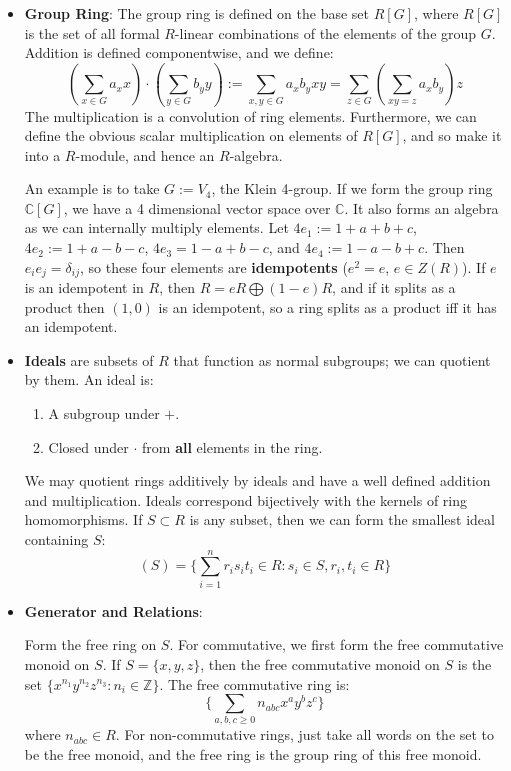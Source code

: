 \documentclass[11pt, oneside]{amsart}   	%
\theoremstyle{definition}
\begin{document}
\begin{itemize}
	\item \textbf{Group Ring}: The group ring is defined on the base set $R[G]$, where $R[G]$ is the set of all formal $R$-linear combinations of the 
	elements of the group $G$. Addition is defined componentwise, and we define:
	$$
		(\sum_{x\in G}a_xx)\cdot(\sum_{y\in G}b_yy) := \sum_{x, y\in G}a_xb_yxy = \sum_{z\in G}(\sum_{xy = z}a_xb_y)z
	$$
	The multiplication is a convolution of ring elements. Furthermore, we can define the obvious scalar multiplication on elements of $R[G]$, and so 
	make it into a $R$-module, and hence an $R$-algebra.
	
	An example is to take $G := V_4$, the Klein 4-group. If we form the group ring $\mathbb C[G]$, we have a 4 dimensional vector space over 
	$\mathbb C$. It also forms an algebra as we can internally multiply elements. Let $4e_1 := 1 + a + b + c$, $4e_2 := 1 + a - b - c$, $4e_3 = 1 - a 
	+ b - c$, and $4e_4 := 1 - a - b + c$. Then $e_ie_j = \delta_{ij}$, so these four elements are \textbf{idempotents} ($e^2 = e$, $e\in Z(R)$). If 
	$e$ is an idempotent in $R$, then $R = eR \bigoplus (1 - e) R$, and if it splits as a product then $(1, 0)$ is an idempotent, so a ring splits as a 
	product iff it has an idempotent.
	
	\item \textbf{Ideals} are subsets of $R$ that function as normal subgroups; we can quotient by them. An ideal is:
		
		\begin{enumerate}
		
			\item A subgroup under $+$.
			
			\item Closed under $\cdot$ from \textbf{all} elements in the ring.
		
		\end{enumerate}
	
	We may quotient rings additively by ideals and have a well defined addition and multiplication. Ideals correspond bijectively with the kernels of ring 
	homomorphisms. If $S\subset R$ is any subset, then we can form the smallest ideal containing $S$:
	$$
		(S) = \{\sum_{i = 1}^nr_is_it_i\in R : s_i\in S, r_i, t_i\in R\}
	$$
	
	\item \textbf{Generator and Relations}:
	
	Form the free ring on $S$. For commutative, we first form the free commutative monoid on $S$. If $S = \{x, y, z\}$, then the free 
	commutative monoid on $S$ is the set $\{x^{n_1}y^{n_2}z^{n_3} : n_i\in\mathbb Z\}$. The free commutative ring is:
	$$
		\{\sum_{a, b, c\geq 0}n_{abc}x^ay^bz^c\}
	$$
	where $n_{abc}\in R$. For non-commutative rings, just take all words on the set to be the free monoid, and the free ring is the group ring of this 
	free monoid.
	

\end{itemize}
\end{document}
